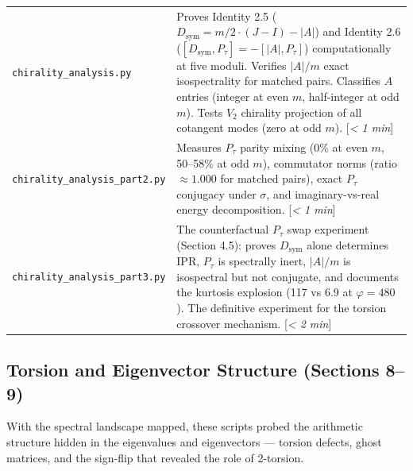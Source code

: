 \documentclass[11pt,letterpaper]{article}
\theoremstyle{definition}
\theoremstyle{remark}
\begin{document}
\begin{longtable}[]{@{}
  >{\raggedright\arraybackslash}p{}
  >{\raggedright\arraybackslash}p{}@{}}
\texttt{chirality\_analysis.py} & Proves Identity 2.5 ($D_{\text{sym}} = m/2 \cdot (J-I) - \lvert A\rvert$) and Identity 2.6 ($[D_{\text{sym}}, P_\tau] = -[\lvert A\rvert, P_\tau]$) computationally at five moduli. Verifies $\lvert A\rvert/m$ exact isospectrality for matched pairs. Classifies $A$ entries (integer at even $m$, half-integer at odd $m$). Tests $V_2$ chirality projection of all cotangent modes (zero at odd $m$). [\textit{\textless{} 1 min}] \\
\texttt{chirality\_analysis\_part2.py} & Measures $P_\tau$ parity mixing (0\% at even $m$, 50--58\% at odd $m$), commutator norms (ratio $\approx 1.000$ for matched pairs), exact $P_\tau$ conjugacy under $\sigma$, and imaginary-vs-real energy decomposition. [\textit{\textless{} 1 min}] \\
\texttt{chirality\_analysis\_part3.py} & The counterfactual $P_\tau$ swap experiment (Section 4.5): proves $D_{\text{sym}}$ alone determines IPR, $P_\tau$ is spectrally inert, $\lvert A\rvert/m$ is isospectral but not conjugate, and documents the kurtosis explosion (117 vs 6.9 at $\varphi = 480$). The definitive experiment for the torsion crossover mechanism. [\textit{\textless{} 2 min}] \\
\end{longtable}

\subsection{Torsion and Eigenvector Structure (Sections 8--9)}\label{torsion-and-eigenvector-structure-sections-89}

With the spectral landscape mapped, these scripts probed the arithmetic structure hidden in the eigenvalues and eigenvectors --- torsion defects, ghost matrices, and the sign-flip that revealed the role of 2-torsion.
\end{document}

